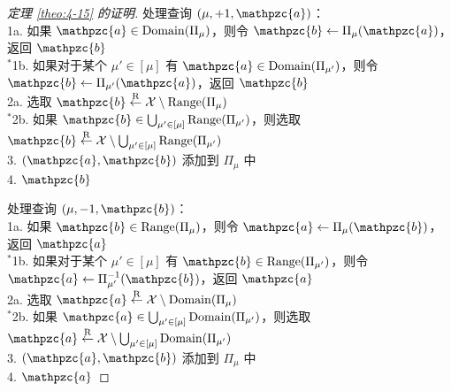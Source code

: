 \begin{proof}[定理 \ref{theo:4-15} 的证明]
\hspace*{5pt} 处理查询 $(\mu,+1,\mathpzc{a})$：\\
\hspace*{26pt} 1a.
\hspace*{2.65pt} 如果 $\mathpzc{a}\in{\rm Domain}(\Pi_{\mu})$，则令 $\mathpzc{b}\leftarrow\Pi_{\mu}(\mathpzc{a})$，返回 $\mathpzc{b}$\\
\hspace*{21.5pt} $^*$1b.
\hspace*{2pt} 如果对于某个 $\mu'\in[\mu]$ 有 $\mathpzc{a}\in{\rm Domain}(\Pi_{\mu'})$，则令 $\mathpzc{b}\leftarrow\Pi_{\mu'}(\mathpzc{a})$，返回 $\mathpzc{b}$\\
\hspace*{26pt} 2a.
\hspace*{2.8pt} 选取 $\mathpzc{b}\overset{\rm R}\leftarrow\mathcal{X}\setminus{\rm Range}(\Pi_{\mu})$\\
\hspace*{21.5pt} $^*$2b.
\hspace*{2pt} 如果 $\mathpzc{b}\in\bigcup_{\mu'\in[\mu]}{\rm Range}(\Pi_{\mu'})$，则选取 $\mathpzc{b}\overset{\rm R}\leftarrow\mathcal{X}\setminus\bigcup_{\mu'\in[\mu]}{\rm Range}(\Pi_{\mu'})$\\
\hspace*{26pt} 3.\quad\; $(\mathpzc{a},\mathpzc{b})$ 添加到 $\Pi_{\mu}$ 中\\
\hspace*{26pt} 4.\quad\; $\mathpzc{b}$

\vspace{5pt}

\hspace*{5pt} 处理查询 $(\mu,-1,\mathpzc{b})$：\\
\hspace*{26pt} 1a.
\hspace*{2.65pt} 如果 $\mathpzc{b}\in{\rm Range}(\Pi_{\mu})$，则令 $\mathpzc{a}\leftarrow\Pi_{\mu}(\mathpzc{b})$，返回 $\mathpzc{a}$\\
\hspace*{21.5pt} $^*$1b.
\hspace*{2pt} 如果对于某个 $\mu'\in[\mu]$ 有 $\mathpzc{b}\in{\rm Range}(\Pi_{\mu'})$，则令 $\mathpzc{a}\leftarrow\Pi_{\mu'}^{-1}(\mathpzc{b})$，返回 $\mathpzc{a}$\\
\hspace*{26pt} 2a.
\hspace*{2.8pt} 选取 $\mathpzc{a}\overset{\rm R}\leftarrow\mathcal{X}\setminus{\rm Domain}(\Pi_{\mu})$\\
\hspace*{21.5pt} $^*$2b.
\hspace*{2pt} 如果 $\mathpzc{a}\in\bigcup_{\mu'\in[\mu]}{\rm Domain}(\Pi_{\mu'})$，则选取 $\mathpzc{a}\overset{\rm R}\leftarrow\mathcal{X}\setminus\bigcup_{\mu'\in[\mu]}{\rm Domain}(\Pi_{\mu'})$\\
\hspace*{26pt} 3.\quad\; $(\mathpzc{a},\mathpzc{b})$ 添加到 $\Pi_{\mu}$ 中\\
\hspace*{26pt} 4.\quad\; $\mathpzc{a}$


\end{proof}
